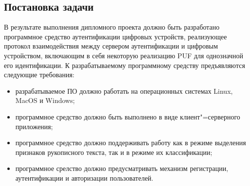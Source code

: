 \subsection{Постановка задачи}
В результате выполнения дипломного проекта должно быть разработано программное средство аутентификации цифровых устройств, реализующее протокол взаимодействия между сервером аутентификации и цифровым устройством, включающим в себя некоторую реализацию PUF для однозначной его идентификации. К разрабатываемому программному средству предъявляются следующие требования:
\begin{itemize}
\item разрабатываемое ПО должно работать на операционных системах Linux, MacOS и Windows;
\item программное средство должно быть выполнено в виде клиент"=серверного приложения;
\item программное средство должно поддерживать работу как в режиме выделения признаков рукописного текста, так и в режиме их классификации;
\item программное срелство должно предусматривать механизм регистрации, аутентификации и авторизации пользователей.
\end{itemize}
